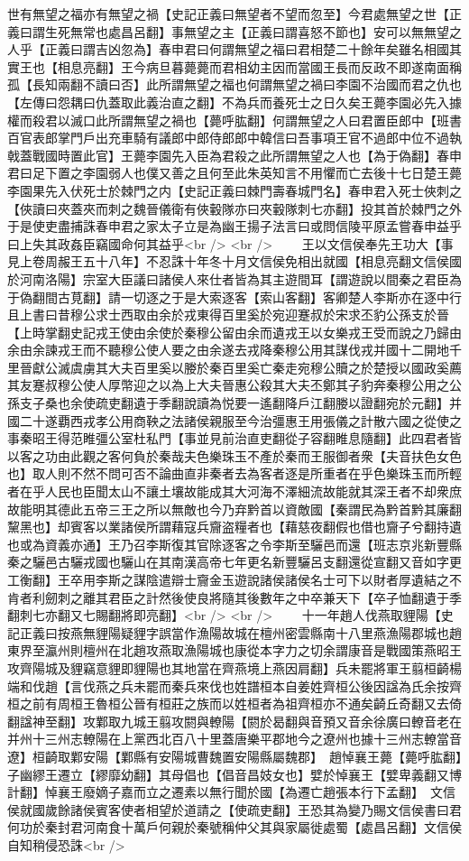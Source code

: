 世有無望之福亦有無望之禍【史記正義曰無望者不望而忽至】今君處無望之世【正義曰謂生死無常也處昌呂翻】事無望之主【正義曰謂喜怒不節也】安可以無無望之人乎【正義曰謂吉凶忽為】春申君曰何謂無望之福曰君相楚二十餘年矣雖名相國其實王也【相息亮翻】王今病旦暮薨薨而君相幼主因而當國王長而反政不即遂南面稱孤【長知兩翻不讀曰否】此所謂無望之福也何謂無望之禍曰李園不治國而君之仇也【左傳曰怨耦曰仇蓋取此義治直之翻】不為兵而養死士之日久矣王薨李園必先入據權而殺君以滅口此所謂無望之禍也【薨呼肱翻】何謂無望之人曰君置臣郎中【班書百官表郎掌門戶出充車騎有議郎中郎侍郎郎中韓信曰吾事項王官不過郎中位不過執戟蓋戰國時置此官】王薨李園先入臣為君殺之此所謂無望之人也【為于偽翻】春申君曰足下置之李園弱人也僕又善之且何至此朱英知言不用懼而亡去後十七日楚王薨李園果先入伏死士於棘門之内【史記正義曰棘門壽春城門名】春申君入死士俠刺之【俠讀曰夾蓋夾而刺之魏晉儀衛有俠轂隊亦曰夾轂隊刺七亦翻】投其首於棘門之外于是使吏盡捕誅春申君之家太子立是為幽王揚子法言曰或問信陵平原孟嘗春申益乎曰上失其政姦臣竊國命何其益乎<br />
<br />
　　王以文信侯奉先王功大【事見上卷周赧王五十八年】不忍誅十年冬十月文信侯免相出就國【相息亮翻文信侯國於河南洛陽】宗室大臣議曰諸侯人來仕者皆為其主遊間耳【謂遊說以間秦之君臣為于偽翻間古莧翻】請一切逐之于是大索逐客【索山客翻】客卿楚人李斯亦在逐中行且上書曰昔穆公求士西取由余於戎東得百里奚於宛迎蹇叔於宋求丕豹公孫支於晉【上時掌翻史記戎王使由余使於秦穆公留由余而遺戎王以女樂戎王受而說之乃歸由余由余諫戎王而不聽穆公使人要之由余遂去戎降秦穆公用其謀伐戎并國十二開地千里晉獻公滅虞虜其大夫百里奚以媵於秦百里奚亡秦走宛穆公贖之於楚授以國政奚薦其友蹇叔穆公使人厚幣迎之以為上大夫晉惠公殺其大夫丕鄭其子豹奔秦穆公用之公孫支子桑也余使疏吏翻遺于季翻說讀為悦要一遙翻降戶江翻媵以證翻宛於元翻】并國二十遂覇西戎孝公用商鞅之法諸侯親服至今治彊惠王用張儀之計散六國之從使之事秦昭王得范睢彊公室杜私門【事並見前治直吏翻從子容翻睢息隨翻】此四君者皆以客之功由此觀之客何負於秦哉夫色樂珠玉不產於秦而王服御者衆【夫音扶色女色也】取人則不然不問可否不論曲直非秦者去為客者逐是所重者在乎色樂珠玉而所輕者在乎人民也臣聞太山不讓土壤故能成其大河海不澤細流故能就其深王者不却衆庶故能明其德此五帝三王之所以無敵也今乃弃黔首以資敵國【秦謂民為黔首黔其廉翻黧黑也】却賓客以業諸侯所謂藉寇兵齎盗糧者也【藉慈夜翻假也借也齎子兮翻持遺也或為資義亦通】王乃召李斯復其官除逐客之令李斯至驪邑而還【班志京兆新豐縣秦之驪邑古驪戎國也驪山在其南漢高帝七年更名新豐驪呂支翻還從宣翻又音如字更工衡翻】王卒用李斯之謀陰遣辯士齎金玉遊說諸侯諸侯名士可下以財者厚遺結之不肯者利劒刺之離其君臣之計然後使良將隨其後數年之中卒兼天下【卒子恤翻遺于季翻刺七亦翻又七賜翻將即亮翻】<br />
<br />
　　十一年趙人伐燕取貍陽【史記正義曰按燕無貍陽疑貍字誤當作漁陽故城在檀州密雲縣南十八里燕漁陽郡城也趙東界至瀛州則檀州在北趙攻燕取漁陽城也康從本字力之切余謂康音是戰國策燕昭王攻齊陽城及貍竊意貍即貍陽也其地當在齊燕境上燕因肩翻】兵未罷將軍王翦桓齮楊端和伐趙【言伐燕之兵未罷而秦兵來伐也姓譜桓本自姜姓齊桓公後因諡為氏余按齊桓之前有周桓王魯桓公晉有桓莊之族而以姓桓者為祖齊桓亦不通矣齮丘奇翻又去倚翻諡神至翻】攻鄴取九城王翦攻閼與轑陽【閼於曷翻與音預又音余徐廣曰轑音老在并州十三州志轑陽在上黨西北百八十里蓋唐樂平郡地今之遼州也據十三州志轑當音遼】桓齮取鄴安陽【鄴縣有安陽城曹魏置安陽縣屬魏郡】　趙悼襄王薨【薨呼肱翻】子幽繆王遷立【繆靡幼翻】其母倡也【倡音昌妓女也】嬖於悼襄王【嬖卑義翻又博計翻】悼襄王廢嫡子嘉而立之遷素以無行聞於國【為遷亡趙張本行下孟翻】　文信侯就國歲餘諸侯賓客使者相望於道請之【使疏吏翻】王恐其為變乃賜文信侯書曰君何功於秦封君河南食十萬戶何親於秦號稱仲父其與家屬徙處蜀【處昌呂翻】文信侯自知稍侵恐誅<br />
